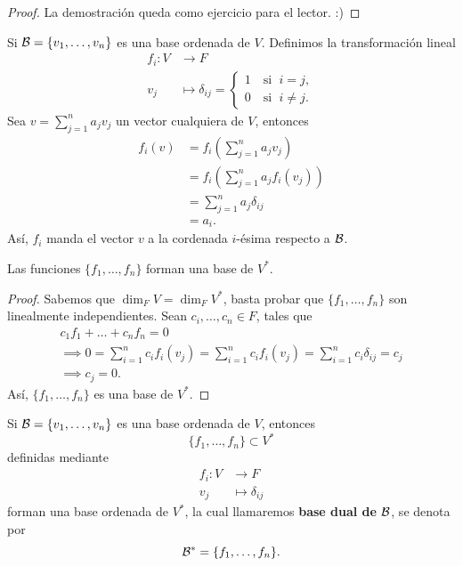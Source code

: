 \documentclass[12pt,a4paper]{book}
\newcommand{\llaves}[1]{\{#1\}}
\newcommand{\parentesis}[1]{\left(#1\right)}
\begin{document}
    \begin{proof}
        La demostración queda como ejercicio para el lector. :)
    \end{proof}


    Si $\BB = \llaves{v_1, \dots, v_n}$ es una base ordenada de $V$. Definimos la transformación lineal
    \begin{align*}
        f_i: V & \longrightarrow F\\
        v_j & \longmapsto \delta_{ij} = 
        \begin{cases}
            1 \quad \text{si } \; i = j,\\
            0 \quad \text{si } \; i \neq j.
        \end{cases}
    \end{align*}
    Sea $v = \sum_{j = 1}^n a_jv_j$ un vector cualquiera de $V$, entonces
    \begin{align*}
        f_i(v) & = f_i\parentesis{\sum_{j = 1}^na_jv_j}\\
        & = f_i\parentesis{\sum_{j = 1}^na_jf_i(v_j)}\\
        & = \sum_{j = 1}^na_j\delta_{ij}\\
        & = a_i.
    \end{align*}
    Así, $f_i$ manda el vector $v$ a la cordenada $i$-ésima respecto a $\mathcal{B}$.

    \begin{proposicion}
        Las funciones $\llaves{f_1, \dots, f_n}$ forman una base de $V^{*}$.
    \end{proposicion}
    
    \begin{proof}
        Sabemos que $\dim_FV = \dim_{F}V^{*}$, basta probar que $\llaves{f_1, \dots, f_n}$ son linealmente independientes. Sean $c_i, \dots, c_n \in F$, tales que 
        \begin{gather*}
            c_1f_1 + \dots + c_nf_n = 0\\
            \implies0= \sum_{i = 1}^nc_if_i(v_j) = \sum_{i = 1}^{n}c_if_i(v_j) = \sum_{i = 1}^{n}c_i \delta_{ij} = c_j\\
            \implies c_j = 0.
        \end{gather*}
        Así, $\llaves{f_1, \dots, f_n}$ es una base de $V^{*}$.
    \end{proof}

    \begin{definicion}
        Si $\BB = \llaves{v_1, \dots, v_n}$ es una base ordenada de $V$, entonces
        \[
        \llaves{f_1, \dots, f_n} \subset V^{*}
        \]
        definidas mediante
        \begin{align*}
            f_i: V & \longrightarrow F\\
            v_j & \longmapsto \delta_{ij}
        \end{align*}
        forman una base ordenada de $V^*$, la cual llamaremos \textbf{base dual de $\mathcal{B}$}, se denota por 
        \[
        \BB^* = \llaves{f_1, \dots, f_n}.
        \]
    \end{definicion}
    
\end{document}
